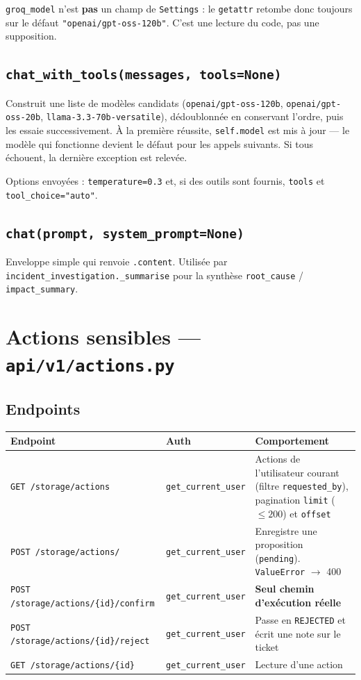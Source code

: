 \documentclass[11pt,a4paper]{report}
\newcommand{\file}[1]{\texttt{\small #1}}
\newcommand{\fn}[1]{\texttt{\small\textcolor{oasisviolet}{#1}}}
\newcommand{\cls}[1]{\texttt{\small\textcolor{oasisblue}{#1}}}
\newcommand{\route}[1]{\texttt{\small\textcolor{oasisgreen}{#1}}}
\newcommand{\arrowto}{\ensuremath{\rightarrow}}
\begin{document}
\begin{infobox}
\texttt{groq\_model} n'est \textbf{pas} un champ de \cls{Settings} : le
\fn{getattr} retombe donc toujours sur le défaut
\texttt{"openai/gpt-oss-120b"}. C'est une lecture du code, pas une supposition.
\end{infobox}

\subsection*{\fn{chat\_with\_tools(messages, tools=None)}}
Construit une liste de modèles candidats
(\texttt{openai/gpt-oss-120b}, \texttt{openai/gpt-oss-20b},
\texttt{llama-3.3-70b-versatile}), dédoublonnée en conservant l'ordre, puis les
essaie successivement. À la première réussite, \texttt{self.model} est mis à
jour --- le modèle qui fonctionne devient le défaut pour les appels suivants. Si
tous échouent, la dernière exception est relevée.

\noindent
Options envoyées : \texttt{temperature=0.3} et, si des outils sont fournis,
\texttt{tools} et \texttt{tool\_choice="auto"}.

\subsection*{\fn{chat(prompt, system\_prompt=None)}}
Enveloppe simple qui renvoie \texttt{.content}. Utilisée par
\fn{incident\_investigation.\_summarise} pour la synthèse
\texttt{root\_cause} / \texttt{impact\_summary}.

\section{Actions sensibles --- \file{api/v1/actions.py}}

\subsection*{Endpoints}

\begin{longtable}{@{}p{4.6cm}p{2.6cm}p{7.5cm}@{}}
\toprule
\textbf{Endpoint} & \textbf{Auth} & \textbf{Comportement}\\
\midrule
\endhead
\route{GET /storage/actions} & \fn{get\_current\_user} & Actions de l'utilisateur courant (filtre \texttt{requested\_by}), pagination \texttt{limit} (\(\le 200\)) et \texttt{offset}\\
\route{POST /storage/actions/} & \fn{get\_current\_user} & Enregistre une proposition (\texttt{pending}). \cls{ValueError} \arrowto{} 400\\
\route{POST /storage/actions/\{id\}/confirm} & \fn{get\_current\_user} & \textbf{Seul chemin d'exécution réelle}\\
\route{POST /storage/actions/\{id\}/reject} & \fn{get\_current\_user} & Passe en \texttt{REJECTED} et écrit une note sur le ticket\\
\route{GET /storage/actions/\{id\}} & \fn{get\_current\_user} & Lecture d'une action\\
\bottomrule
\end{longtable}
\end{document}
